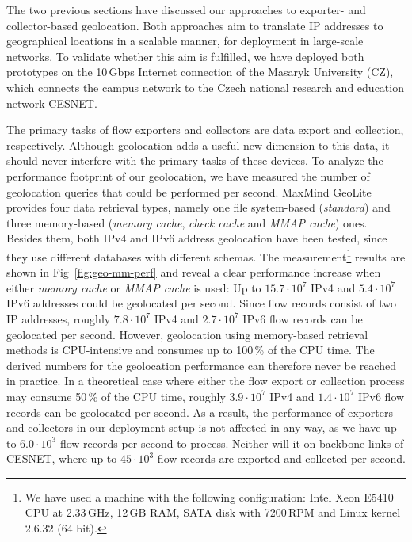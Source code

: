 The two previous sections have discussed our approaches to exporter- and collector-based geolocation. Both approaches aim to translate IP addresses to geographical locations in a scalable manner, for deployment in large-scale networks. To validate whether this aim is fulfilled, we have deployed both prototypes on the 10\,Gbps Internet connection of the Masaryk University (CZ), which connects the campus network to the Czech national research and education network CESNET.

The primary tasks of flow exporters and collectors are data export and collection, respectively. Although geolocation adds a useful new dimension to this data, it should never interfere with the primary tasks of these devices. To analyze the performance footprint of our geolocation, we have measured the number of geolocation queries that could be performed per second. MaxMind GeoLite provides four data retrieval types, namely one file system-based (\textit{standard}) and three memory-based (\textit{memory cache}, \textit{check cache} and \textit{MMAP cache}) ones. Besides them, both IPv4 and IPv6 address geolocation have been tested, since they use different databases with different schemas. The measurement\footnote{We have used a machine with the following configuration: Intel Xeon E5410 CPU at 2.33\,GHz, 12\,GB RAM, SATA disk with 7200\,RPM and Linux kernel 2.6.32 (64 bit).} results are shown in Fig~\ref{fig:geo-mm-perf} and reveal a clear performance increase when either \textit{memory cache} or \textit{MMAP cache} is used: Up to $15.7 \cdot 10^7$ IPv4 and $5.4 \cdot 10^7$ IPv6 addresses could be geolocated per second. Since flow records consist of two IP addresses, roughly $7.8 \cdot 10^7$ IPv4 and $2.7 \cdot 10^7$ IPv6 flow records can be geolocated per second. However, geolocation using memory-based retrieval methods is CPU-intensive and consumes up to 100\,\% of the CPU time. The derived numbers for the geolocation performance can therefore never be reached in practice. In a theoretical case where either the flow export or collection process may consume 50\,\% of the CPU time, roughly $3.9 \cdot 10^7$ IPv4 and $1.4 \cdot 10^7$ IPv6 flow records can be geolocated per second. As a result, the performance of exporters and collectors in our deployment setup is not affected in any way, as we have up to $6.0 \cdot 10^3$ flow records per second to process. Neither will it on backbone links of CESNET, where up to $45 \cdot 10^3$ flow records are exported and collected per second.

